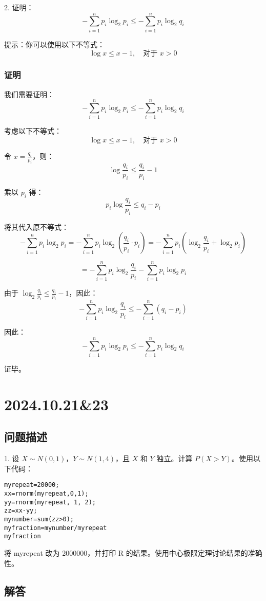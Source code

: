 \documentclass[UTF8]{report}
\theoremstyle{MyLineTheoremStyle} %
\theoremstyle{MyBlockTheoremStyle} %
\theoremstyle{MySubsubsectionStyle} %
\begin{document}
2. 证明：
\[
-\sum_{i=1}^{n} p_i \log_2 p_i \leq -\sum_{i=1}^{n} p_i \log_2 q_i
\]

提示：你可以使用以下不等式：
\[
\log x \leq x - 1, \quad \text{对于 } x > 0
\]

\subsection*{证明}

我们需要证明：
\[
-\sum_{i=1}^{n} p_i \log_2 p_i \leq -\sum_{i=1}^{n} p_i \log_2 q_i
\]

考虑以下不等式：
\[
\log x \leq x - 1, \quad \text{对于 } x > 0
\]

令 \(x = \frac{q_i}{p_i}\)，则：
\[
\log \frac{q_i}{p_i} \leq \frac{q_i}{p_i} - 1
\]

乘以 \(p_i\) 得：
\[
p_i \log \frac{q_i}{p_i} \leq q_i - p_i
\]

将其代入原不等式：
\[
-\sum_{i=1}^{n} p_i \log_2 p_i = -\sum_{i=1}^{n} p_i \log_2 \left( \frac{q_i}{p_i} \cdot p_i \right) = -\sum_{i=1}^{n} p_i \left( \log_2 \frac{q_i}{p_i} + \log_2 p_i \right)
\]

\[
= -\sum_{i=1}^{n} p_i \log_2 \frac{q_i}{p_i} - \sum_{i=1}^{n} p_i \log_2 p_i
\]

由于 \(\log_2 \frac{q_i}{p_i} \leq \frac{q_i}{p_i} - 1\)，因此：
\[
-\sum_{i=1}^{n} p_i \log_2 \frac{q_i}{p_i} \leq -\sum_{i=1}^{n} (q_i - p_i)
\]

因此：
\[
-\sum_{i=1}^{n} p_i \log_2 p_i \leq -\sum_{i=1}^{n} p_i \log_2 q_i
\]

证毕。

\chapter{2024.10.21\&23}\thispagestyle{fancy}

\section{问题描述}

1. 设 \(X \sim N(0, 1)\)，\(Y \sim N(1, 4)\)，且 \(X\) 和 \(Y\) 独立。计算 \(P(X > Y)\)。使用以下代码：
\begin{verbatim}
myrepeat=20000;
xx=rnorm(myrepeat,0,1);
yy=rnorm(myrepeat, 1, 2);
zz=xx-yy;
mynumber=sum(zz>0);
myfraction=mynumber/myrepeat
myfraction
\end{verbatim}
将 myrepeat 改为 2000000，并打印 R 的结果。使用中心极限定理讨论结果的准确性。

\section{解答}
\end{document}
